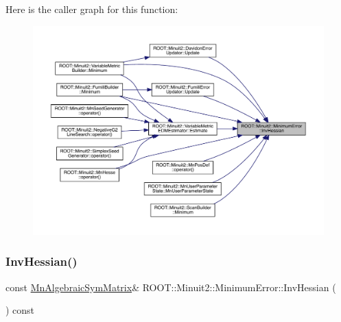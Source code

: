 Here is the caller graph for this function\+:
\nopagebreak
\begin{figure}[H]
\begin{center}
\leavevmode
\includegraphics[width=350pt]{d5/d32/classROOT_1_1Minuit2_1_1MinimumError_acfa9206a47e5fdf2d9aa1928aaf5cd04_icgraph}
\end{center}
\end{figure}
\mbox{\label{classROOT_1_1Minuit2_1_1MinimumError_acfa9206a47e5fdf2d9aa1928aaf5cd04}} 
\subsubsection{\texorpdfstring{InvHessian()}{InvHessian()}\hspace{0.1cm}{\footnotesize\ttfamily [2/3]}}
{\footnotesize\ttfamily const \mbox{\hyperlink{namespaceROOT_1_1Minuit2_a9e74ad97f5537a2e80e52b04d98ecc6e}{Mn\+Algebraic\+Sym\+Matrix}}\& R\+O\+O\+T\+::\+Minuit2\+::\+Minimum\+Error\+::\+Inv\+Hessian (\begin{DoxyParamCaption}{ }\end{DoxyParamCaption}) const\hspace{0.3cm}{\ttfamily [inline]}}

\mbox{\label{classROOT_1_1Minuit2_1_1MinimumError_acfa9206a47e5fdf2d9aa1928aaf5cd04}} 
